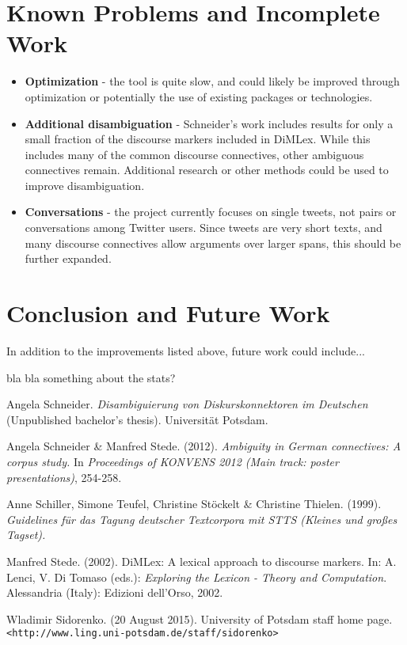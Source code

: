\documentclass[11pt]{article}
\def\mono#1{\texttt{#1}}  %
\begin{document}
\section{Known Problems and Incomplete Work}
\begin{itemize}
\item \textbf{Optimization} - the tool is quite slow, and could likely be improved through optimization or potentially the use of existing packages or technologies.
\item \textbf{Additional disambiguation} - Schneider's work includes results for only a small fraction of the discourse markers included in DiMLex.  While this includes many of the common discourse connectives, other ambiguous connectives remain.  Additional research or other methods could be used to improve disambiguation.
\item \textbf{Conversations} - the project currently focuses on single tweets, not pairs or conversations among Twitter users.  Since tweets are very short texts, and many discourse connectives allow arguments over larger spans, this should be further expanded.

\end{itemize}

\section{Conclusion and Future Work}

In addition to the improvements listed above, future work could include...

bla bla something about the stats?

\begin{thebibliography}{} 

 Angela Schneider.  \emph{Disambiguierung von Diskurskonnektoren im Deutschen} (Unpublished bachelor's thesis). Universit{\"a}t Potsdam.

 Angela Schneider \& Manfred Stede.  (2012). \emph{Ambiguity in German connectives: A corpus study.}  In \emph{Proceedings of KONVENS 2012 (Main track: poster presentations)}, 254-258.

 Anne Schiller, Simone Teufel, Christine St{\"o}ckelt \& Christine Thielen. (1999).  \emph{Guidelines f{\"u}r das Tagung deutscher Textcorpora mit STTS (Kleines und gro{\ss}es Tagset).}

Manfred Stede. (2002). DiMLex: A lexical approach to discourse markers. In: A. Lenci, V. Di Tomaso (eds.): \emph{Exploring the Lexicon - Theory and Computation}. Alessandria (Italy): Edizioni dell'Orso, 2002.

 Wladimir Sidorenko.  (20 August 2015).  University of Potsdam staff home page.  \mono{<http://www.ling.uni-potsdam.de/staff/sidorenko>}


\end{thebibliography}
\end{document}
